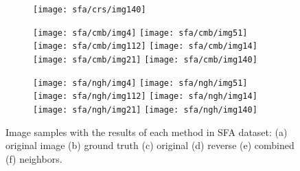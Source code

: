 \begin{figure*}[!htb]
\begin{subfigure}[t]{0.15\textwidth}
        \texttt{[image: sfa/crs/img140]}
        \caption{}
    \end{subfigure}
    \begin{subfigure}[t]{0.15\textwidth}
        \texttt{[image: sfa/cmb/img4]}
        \texttt{[image: sfa/cmb/img51]}
        \texttt{[image: sfa/cmb/img112]}
        \texttt{[image: sfa/cmb/img14]}
        \texttt{[image: sfa/cmb/img21]}
        \texttt{[image: sfa/cmb/img140]}
        \caption{}
    \end{subfigure}
    \begin{subfigure}[t]{0.15\textwidth}
        \texttt{[image: sfa/ngh/img4]}
        \texttt{[image: sfa/ngh/img51]}
        \texttt{[image: sfa/ngh/img112]}
        \texttt{[image: sfa/ngh/img14]}
        \texttt{[image: sfa/ngh/img21]}
        \texttt{[image: sfa/ngh/img140]}
        \caption{}
    \end{subfigure}

    \caption[Image samples with the results of each method in SFA dataset]{Image samples with the results of each method in SFA dataset: (a) original image (b) ground truth (c) original \cite{brancati:17} (d) reverse (e) combined (f) neighbors.}
    \label{fig:results_sfa}
\end{figure*}

